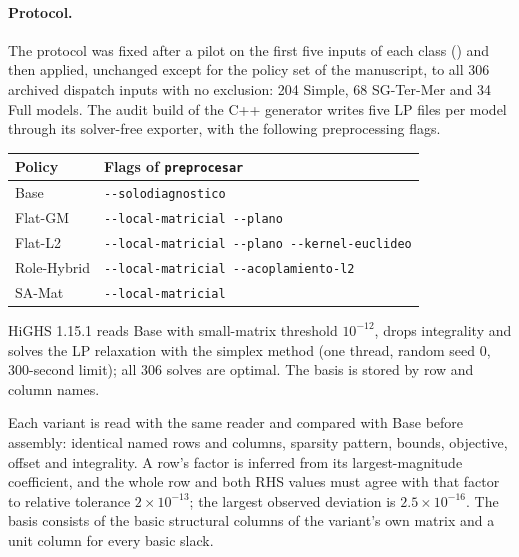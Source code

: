 \documentclass[11pt]{article}
\begin{document}
\paragraph{Protocol.}
The protocol was fixed after a pilot on the first five inputs of each class
() and then applied, unchanged except for the policy
set of the manuscript, to all 306 archived dispatch inputs with no exclusion: 204 Simple, 68
SG-Ter-Mer and 34 Full models. The audit build of the C++ generator writes five LP files per model through its
solver-free exporter, with the following preprocessing flags.
\begin{center}\small
\begin{tabular}{ll}
\toprule
Policy & Flags of \texttt{preprocesar}\\
\midrule
Base & \texttt{-{}-solodiagnostico}\\
Flat-GM & \texttt{-{}-local-matricial -{}-plano}\\
Flat-L2 & \texttt{-{}-local-matricial -{}-plano -{}-kernel-euclideo}\\
Role-Hybrid & \texttt{-{}-local-matricial -{}-acoplamiento-l2}\\
SA-Mat & \texttt{-{}-local-matricial}\\
\bottomrule
\end{tabular}
\end{center}
HiGHS 1.15.1 reads Base with small-matrix threshold $10^{-12}$, drops integrality and solves the
LP relaxation with the simplex method (one thread, random seed 0, 300-second limit); all 306
solves are optimal. The basis is stored by row and column names.

Each variant is read with the same reader and compared with Base before assembly: identical
named rows and columns, sparsity pattern, bounds, objective, offset and integrality. A row's
factor is inferred from its largest-magnitude coefficient, and the whole row and both RHS values
must agree with that factor to relative tolerance $2\times10^{-13}$; the largest observed
deviation is $2.5\times10^{-16}$. The basis consists of the basic structural columns of the
variant's own matrix and a unit column for every basic slack.
\end{document}
